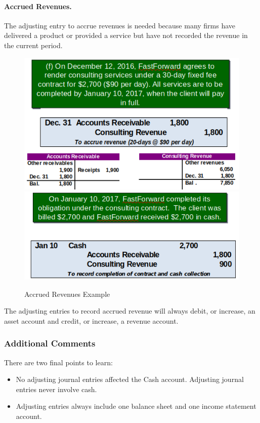 \documentclass[../main.tex]{subfiles}
\begin{document}
	\paragraph{Accrued Revenues.} The adjusting entry to accrue revenues is 
	needed because many firms have delivered a product or provided a service 
	but have not recorded the revenue in the current period.
	
 	\begin{figure}[ht!]
		\centering
		\includegraphics[width=0.9\columnwidth]{images/c3/accrued_revenue_eg1.png}
		\includegraphics[width=0.9\columnwidth]{images/c3/accrued_revenue_eg2.png}
		\caption{Accrued Revenues Example}	
	\end{figure}
	
	The adjusting entries to record accrued revenue will always debit, or 
	increase, an asset account and credit, or increase, a revenue account.
	
	\subsubsection{Additional Comments}
	
	There are two final points to learn:
	\begin{itemize}[noitemsep]
		\item No adjusting journal entries affected the Cash account. Adjusting 
		journal entries never involve cash.
		\item Adjusting entries always include one balance sheet and one income 
		statement account.
	\end{itemize}
\end{document}
